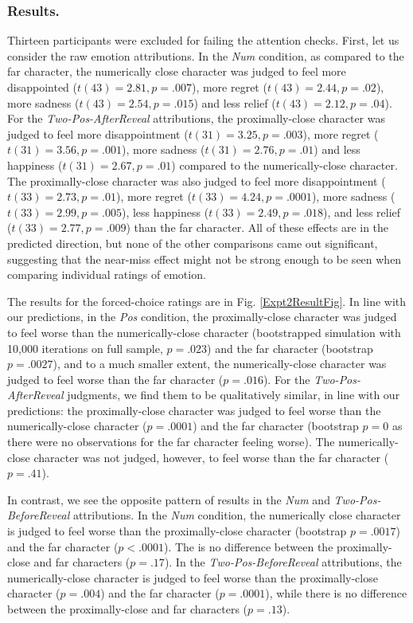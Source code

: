 \documentclass[10pt,letterpaper]{article}
\begin{document}
\subsubsection{Results.} Thirteen participants were excluded for failing the attention checks.
First, let us consider the raw emotion attributions. In the \textit{Num} condition, as compared to the far character, the numerically close character was judged to feel more disappointed ($t(43)=2.81, p=.007$), more regret ($t(43)=2.44, p=.02$), more sadness ($t(43)=2.54, p=.015$) and less relief ($t(43)=2.12, p=.04$). For the \textit{Two-Pos-AfterReveal} attributions, the proximally-close character was judged to feel more disappointment ($t(31)=3.25, p=.003$), more regret ($t(31)=3.56, p=.001$), more sadness ($t(31)=2.76, p=.01$) and less happiness ($t(31)=2.67, p=.01$) compared to the numerically-close character. The proximally-close character was also judged to feel more disappointment ($t(33)=2.73, p=.01$), more regret ($t(33)=4.24, p=.0001$), more sadness ($t(33)=2.99, p=.005$), less happiness ($t(33)=2.49, p=.018$), and less relief ($t(33)=2.77, p=.009$) than the far character. All of these effects are in the predicted direction, but none of the other comparisons came out significant, suggesting that the near-miss effect might not be strong enough to be seen when comparing individual ratings of emotion.




The results for the forced-choice ratings are in Fig. \ref{Expt2ResultFig}. In line with our predictions, in the \textit{Pos} condition, the proximally-close character was judged to feel worse than the numerically-close character (bootstrapped simulation with 10,000 iterations on full sample, $p=.023$) and the far character (bootstrap $p=.0027$), and to a much smaller extent, the numerically-close character was judged to feel worse than the far character ($p=.016$). For the \textit{Two-Pos-AfterReveal} judgments, we find them to be qualitatively similar, in line with our predictions: the proximally-close character was judged to feel worse than the numerically-close character ($p=.0001$) and the far character (bootstrap $p=0$ as there were no observations for the far character feeling worse). The numerically-close character was not judged, however, to feel worse than the far character ($p=.41$).

In contrast, we see the opposite pattern of results in the \textit{Num} and \textit{Two-Pos-BeforeReveal} attributions. In the \textit{Num} condition, the numerically close character is judged to feel worse than the proximally-close character (bootstrap $p=.0017$) and the far character ($p<.0001$). The is no difference between the proximally-close and far characters ($p=.17$). In the \textit{Two-Pos-BeforeReveal} attributions, the numerically-close character is judged to feel worse than the proximally-close character ($p=.004$) and the far character ($p=.0001$), while there is no difference between the proximally-close and far characters ($p=.13$).
\end{document}
